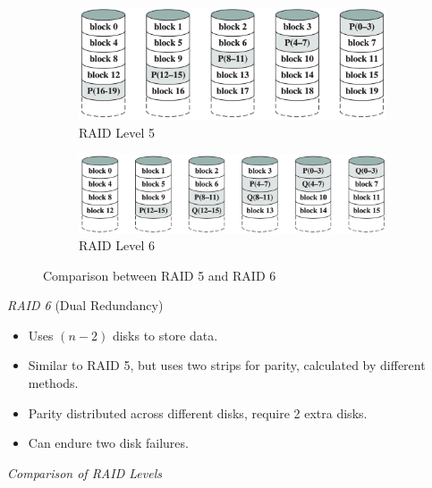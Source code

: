 \begin{figure}[H]
    \centering
    \hfill
    \begin{subfigure}{0.4\textwidth}
        \centering
        \includegraphics[width=\textwidth]{chaps/memory/external-memory/raid-level-5.png}
        \caption{RAID Level 5}
    \end{subfigure}
    \hfill
    \begin{subfigure}{0.5\textwidth}
        \centering
        \includegraphics[width=\textwidth]{chaps/memory/external-memory/raid-level-6.png}
        \caption{RAID Level 6}
    \end{subfigure}
    \hfill
    \caption{Comparison between RAID 5 and RAID 6}
\end{figure}

\emph{RAID 6} {\normalfont\large (Dual Redundancy)}

\begin{itemize}
    \item Uses $(n-2)$ disks to store data.
    \item Similar to RAID 5, but uses two strips for parity, calculated by different methods.
    \item Parity distributed across different disks, require 2 extra disks.
    \item Can endure two disk failures.
\end{itemize}

\pagebreak

\emph{Comparison of RAID Levels}

